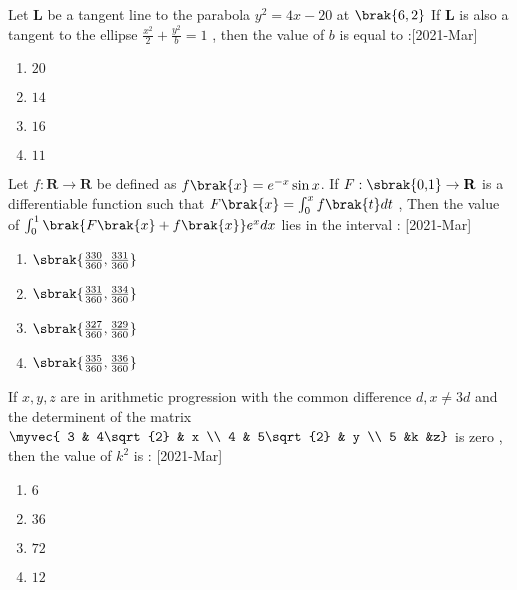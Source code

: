    \item Let $\mathbf{L}$ be a tangent line to the parabola $y^2 = 4x -20$ at $\brak{6,2}$
	   If $\mathbf{L}$ is also a tangent to the ellipse $\frac{x^2}{2} + \frac{y^2}{b} = 1$ , then the value of $b$ is equal to :\hfill[2021-Mar]
   \begin{multicols}{2}
       \begin{enumerate}
           \item $20$
           \item $14$
           \item $16$
           \item $11$\\
       \end{enumerate}
   \end{multicols}
   \item Let $f : \mathbf{R} \rightarrow \mathbf{R}$ be defined as $f\brak{x} = e^{-x} \sin{x}$. If $F : \sbrak{0 \text{,} 1} \rightarrow \mathbf{R}$ is a differentiable function such that $F\brak{x} = \int_0^{x} f\brak{t}dt$ , Then the value of $\int_0^1 \brak{F\brak{x}+f\brak{x}}e^x dx$ lies in the interval : \hfill[2021-Mar]
   \begin{multicols}{2}
       \begin{enumerate}
           \item $\sbrak{\frac{330}{360}, \frac{331}{360}}$\\
           \item $\sbrak{\frac{331}{360} , \frac{334}{360}}$
            \item $\sbrak{\frac{327}{360}, \frac{329}{360}}$\\
             \item $\sbrak{\frac{335}{360}, \frac{336}{360}}$
       \end{enumerate}
   \end{multicols}
   \item If $x , y, z$ are in arithmetic progression with the common difference $d , x \neq 3d$ and the determinent of the matrix $\myvec{ 3 & 4\sqrt{2} & x \\ 4 & 5\sqrt{2} & y \\ 5 &k &z}$ is zero , then the value of $k^2$ is : \hfill[2021-Mar]
   \begin{multicols}{2}
       \begin{enumerate}
           \item $6$
           \item $36$\\
           \item $72$
           \item $12$
       \end{enumerate}
   \end{multicols}
